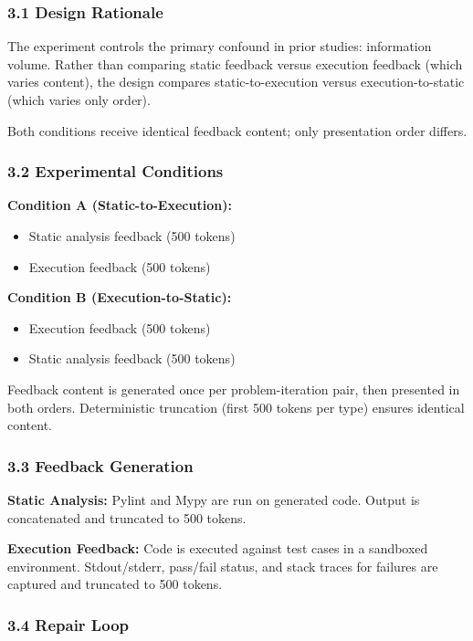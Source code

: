 
\subsubsection{3.1 Design Rationale}

The experiment controls the primary confound in prior studies: information volume. Rather than comparing static feedback versus execution feedback (which varies content), the design compares static-to-execution versus execution-to-static (which varies only order).

Both conditions receive identical feedback content; only presentation order differs.

\subsubsection{3.2 Experimental Conditions}

\textbf{Condition A (Static-to-Execution):}
\begin{itemize}
\item Static analysis feedback (500 tokens)
\item Execution feedback (500 tokens)
\end{itemize}

\textbf{Condition B (Execution-to-Static):}
\begin{itemize}
\item Execution feedback (500 tokens)
\item Static analysis feedback (500 tokens)
\end{itemize}

Feedback content is generated once per problem-iteration pair, then presented in both orders. Deterministic truncation (first 500 tokens per type) ensures identical content.

\subsubsection{3.3 Feedback Generation}

\textbf{Static Analysis:} Pylint and Mypy are run on generated code. Output is concatenated and truncated to 500 tokens.

\textbf{Execution Feedback:} Code is executed against test cases in a sandboxed environment. Stdout/stderr, pass/fail status, and stack traces for failures are captured and truncated to 500 tokens.

\subsubsection{3.4 Repair Loop}

